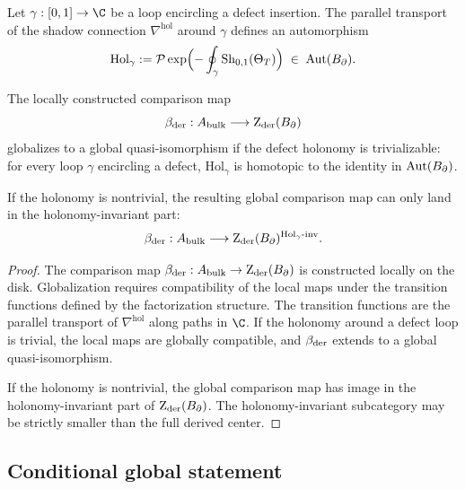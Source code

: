 \begin{definition}
Let $\gamma:[0,1]\to\C$ be a loop encircling a defect insertion.
The parallel transport of the shadow connection
$\nabla^{\mathrm{hol}}$ around $\gamma$ defines an automorphism
\begin{equation}%
\mathrm{Hol}_\gamma
:= \mathcal{P}\exp\Bigl(
-\oint_\gamma\mathrm{Sh}_{0,1}(\Theta_T)
\Bigr)
\;\in\;
\operatorname{Aut}(\Bbound).
\end{equation}
\end{definition}

\begin{proposition}
\label{prop:holonomy-obstruction}
The locally constructed comparison map
\[
\beta_{\mathrm{der}}:A_{\mathrm{bulk}}\longrightarrow\operatorname{Z}_{\mathrm{der}}(B_{\partial})
\]
globalizes to a global quasi-isomorphism if the defect holonomy
is trivializable: for every loop $\gamma$ encircling a defect,
$\mathrm{Hol}_\gamma$ is homotopic to the identity in
$\operatorname{Aut}(B_{\partial})$.

If the holonomy is nontrivial, the resulting global comparison map
can only land in the holonomy-invariant part:
\[
\beta_{\mathrm{der}}:A_{\mathrm{bulk}}
\longrightarrow
\operatorname{Z}_{\mathrm{der}}(B_{\partial})^{\mathrm{Hol}_\gamma\text{-inv}}.
\]
\end{proposition}

\begin{proof}
The comparison map $\beta_{\mathrm{der}}:A_{\mathrm{bulk}}\to\operatorname{Z}_{\mathrm{der}}(B_{\partial})$ is
constructed locally on the disk. Globalization requires
compatibility of the local maps under the transition functions
defined by the factorization structure. The transition functions
are the parallel transport of $\nabla^{\mathrm{hol}}$ along paths
in $\C$. If the holonomy around a defect loop is trivial, the
local maps are globally compatible, and $\beta_{\mathrm{der}}$ extends to
a global quasi-isomorphism.

If the holonomy is nontrivial, the global comparison map has image
in the holonomy-invariant part of $\operatorname{Z}_{\mathrm{der}}(B_{\partial})$. The
holonomy-invariant subcategory may be strictly smaller than the
full derived center.
\end{proof}


\subsection{Conditional global statement}

